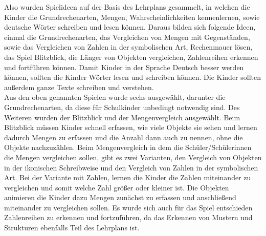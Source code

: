 Also wurden Spielideen auf der Basis des Lehrplans gesammelt, in welchen die Kinder die Grundrechenarten, Mengen, Wahrscheinlichkeiten kennenlernen, sowie deutsche Wörter schreiben und lesen können. Daraus bilden sich folgende Ideen, einmal die Grundrechenarten, das Vergleichen von Mengen mit Gegenständen, sowie das Vergleichen von Zahlen in der symbolischen Art, Rechenmauer lösen, das Spiel Blitzblick, die Länger von Objekten vergleichen, Zahlenreihen erkennen und fortführen können. Damit Kinder in der Sprache Deutsch besser werden können, sollten die Kinder Wörter lesen und schreiben können. Die Kinder sollten außerdem ganze Texte schreiben und verstehen.\\
Aus den oben genannten Spielen wurde sechs ausgewählt, darunter die Grundrechenarten, da diese für Schulkinder unbedingt notwendig sind. Des Weiteren wurden der Blitzblick und der Mengenvergleich ausgewählt. Beim Blitzblick müssen Kinder schnell erfassen, wie viele Objekte sie sehen und lernen dadurch Mengen zu erfassen und die Anzahl dann auch zu nennen, ohne die Objekte nachzuzählen. Beim Mengenvergleich in dem die Schüler/Schülerinnen die Mengen vergleichen sollen, gibt es zwei Varianten, den Vergleich von Objekten in der ikonischen Schreibweise und den Vergleich von Zahlen in der symbolischen Art. Bei der Variante mit Zahlen, lernen die Kinder die Zahlen miteinander zu vergleichen und somit welche Zahl größer oder kleiner ist. Die Objekten animieren die Kinder dazu Mengen zunächst zu erfassen und anschließend miteinander zu vergleichen sollen. Es wurde sich auch für das Spiel entschieden Zahlenreihen zu erkennen und fortzuführen, da das Erkennen von Mustern und Strukturen ebenfalls Teil des Lehrplans ist.
